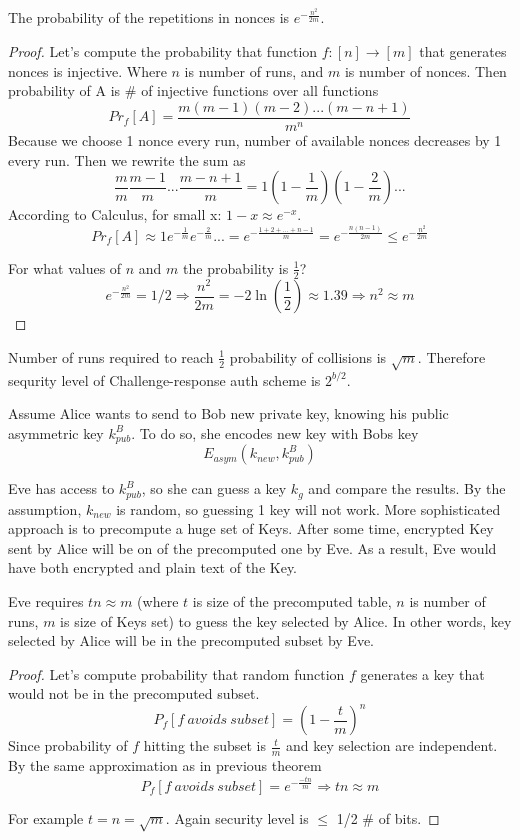\begin{theorem}
	The probability of the repetitions in nonces is $e^{-\frac{n^2}{2m}}$.
\end{theorem}
\begin{proof}
	Let's compute the probability that function $f:[n] \to [m]$ that generates nonces is injective. Where $n$ is number of runs, and $m$ is number of nonces.
	Then probability of A is \# of injective functions over all functions
	\[ Pr_f[A] = \frac{m(m-1)(m-2)...(m-n+1)}{m^n}\]
	Because we choose 1 nonce every run, number of available nonces decreases by 1 every run. Then we rewrite the sum as
	\[ \frac{m}{m} \frac{m-1}{m} ... \frac{m-n+1}{m} = 1 (1 - \frac{1}{m}) (1 - \frac{2}{m}) ...\]
	According to Calculus, for small x: $1 - x \approx e^{-x}$.
	\[ Pr_f[A] \approx 1 e^{-\frac{1}{m}} e^{-\frac{2}{m}} ... = e^{-\frac{1 + 2 + ... + n - 1}{m}} = e^{-\frac{n(n-1)}{2m}} \leq e^{-\frac{n^2}{2m}} \]

	For what values of $n$ and $m$ the probability is $\frac{1}{2}$?
	\[ e^{-\frac{n^2}{2m}} = 1/2 \Rightarrow \frac{n^2}{2m} = -2 \ln\left(\frac{1}{2}\right) \approx 1.39 \Rightarrow n^2 \approx m \]
\end{proof}

\begin{consequence}
	Number of runs required to reach $\frac{1}{2}$ probability of collisions is $\sqrt{m}$. Therefore sequrity level of Challenge-response auth scheme is $2^{b/2}$.
\end{consequence}


\begin{example}
	Assume Alice wants to send to Bob new private key, knowing his public asymmetric key $k_{pub}^B$. To do so, she encodes new key with Bobs key
	\[ E_{asym}(k_{new}, k_{pub}^B) \]

	Eve has access to $k_{pub}^B$, so she can guess a key $k_{g}$ and compare the results. By the assumption, $k_{new}$ is random, so guessing 1 key will not work.
	More sophisticated approach is to precompute a huge set of Keys.
	After some time, encrypted Key sent by Alice will be on of the precomputed one by Eve.
	As a result, Eve would have both encrypted and plain text of the Key.
\end{example}

\begin{theorem}
	Eve requires $tn \approx m$ (where $t$ is size of the precomputed table, $n$ is number of runs, $m$ is size of Keys set) to guess the key selected by Alice.
	In other words, key selected by Alice will be in the precomputed subset by Eve.
\end{theorem}
\begin{proof}
	Let's compute probability that random function $f$ generates a key that would not be in the precomputed subset.
	\[ P_f[f\ avoids \ subset] = (1 - \frac{t}{m})^n \]
	Since probability of $f$ hitting the subset is $\frac{t}{m}$ and key selection are independent.
	By the same approximation as in previous theorem
	\[ P_f[f\ avoids \ subset] = e^{-\frac{-tn}{m}} \Rightarrow tn \approx m \]

	For example $t = n = \sqrt{m}$. Again security level is $\leq$ 1/2 \# of bits.
\end{proof}
